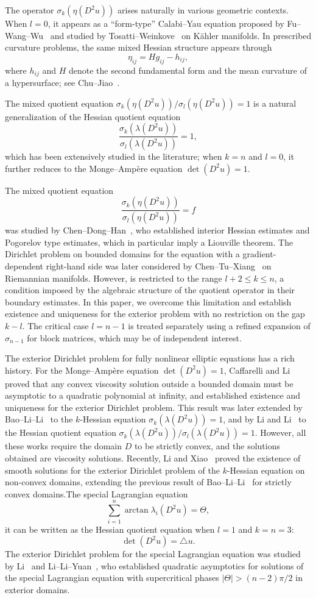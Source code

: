 \documentclass[reqno,a4paper]{amsart}
\numberwithin{equation}{section}
\begin{document}
	The operator $\sigma_k(\eta(D^2 u))$ arises naturally in various geometric contexts. When $l=0$, it appears as a ``form-type'' Calabi--Yau equation proposed by Fu--Wang--Wu~\cite{FW10} and studied by Tosatti--Weinkove~\cite{TW17} on K\"ahler manifolds. In prescribed curvature problems, the same mixed Hessian structure appears through
	\[
	\eta_{ij} = H g_{ij} - h_{ij},
	\]
	where $h_{ij}$ and $H$ denote the second fundamental form and the mean curvature of a hypersurface; see Chu--Jiao~\cite{CJ21}.
	
	The mixed quotient equation $\sigma_k(\eta(D^2 u)) / \sigma_l(\eta(D^2 u)) = 1$ is a natural generalization of the Hessian quotient equation
	\[
	\frac{\sigma_k(\lambda(D^2 u))}{\sigma_l(\lambda(D^2 u))} = 1,
	\]
	which has been extensively studied in the literature; when $k=n$ and $l=0$, it further reduces to the Monge--Amp\`ere equation $\det(D^2 u) = 1$. 
	
	The mixed quotient equation $$\dfrac{\sigma_k(\eta(D^2 u))}{\sigma_l(\eta(D^2 u))} = f$$ was studied by Chen--Dong--Han~\cite{CDH22}, who established interior Hessian estimates and Pogorelov type estimates, which in particular imply a Liouville theorem. The Dirichlet problem on bounded domains for the equation with a gradient-dependent right-hand side was later considered by Chen--Tu--Xiang~\cite{CTX23} on Riemannian manifolds.  However, is restricted to the range $l+2 \le k \le n$, a condition imposed by the algebraic structure of the quotient operator in their boundary estimates. In this paper, we overcome this limitation and establish existence and uniqueness for the exterior problem with no restriction on the gap $k-l$. The critical case $l = n-1$ is treated separately using a refined expansion of $\sigma_{n-1}$ for block matrices, which may be of independent interest.
	
	The exterior Dirichlet problem for fully nonlinear elliptic equations has a rich history. For the Monge--Amp\`ere equation $\det(D^2u)=1$, Caffarelli and Li~\cite{CL03} proved that any convex viscosity solution outside a bounded domain must be asymptotic to a quadratic polynomial at infinity, and established existence and uniqueness for the exterior Dirichlet problem. This result was later extended by Bao--Li--Li~\cite{BLL14} to the $k$-Hessian equation $\sigma_k(\lambda(D^2u))=1$, and by Li and Li~\cite{LL18} to the Hessian quotient equation $\sigma_k(\lambda(D^2u))/\sigma_l(\lambda(D^2u))=1$. However, all these works require the domain $D$ to be strictly convex, and the solutions obtained are viscosity solutions.
	Recently, Li and Xiao~\cite{LYX26} proved the existence of smooth solutions for the exterior Dirichlet problem of the $k$-Hessian equation on non-convex domains, extending the previous result of Bao--Li--Li~\cite{BLL14} for strictly convex domains.The special Lagrangian equation
	\[
	\sum_{i=1}^n \arctan \lambda_i(D^2u) = \Theta,
	\]
	it can be written as the Hessian quotient equation when $l=1$ and $k=n=3$:
	\[
	\det(D^2u)= \triangle u.
	\]
	The exterior Dirichlet problem for the special Lagrangian equation was studied by  Li~\cite{Li19} and Li--Li--Yuan~\cite{LLY20}, who established quadratic asymptotics for solutions of the special Lagrangian equation with supercritical phases $|\Theta|>(n-2)\pi/2$ in exterior domains.
	
\end{document}
